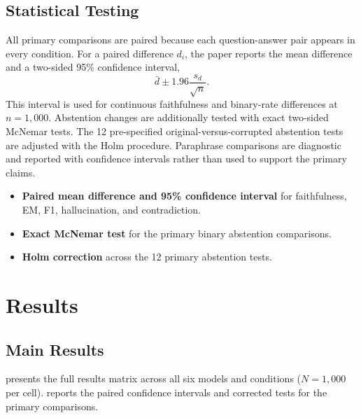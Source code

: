 \documentclass[11pt]{article}
\begin{document}
\subsection{Statistical Testing}

All primary comparisons are paired because each question-answer pair appears in every
condition. For a paired difference $d_i$, the paper reports the mean difference and a
two-sided 95\% confidence interval,
\begin{equation}
  \bar d \pm 1.96\frac{s_d}{\sqrt{n}}.
  \label{eq:paired-ci}
\end{equation}
This interval is used for continuous faithfulness and binary-rate differences at
$n=1{,}000$. Abstention changes are additionally tested with exact two-sided McNemar
tests. The 12 pre-specified original-versus-corrupted abstention tests are adjusted with
the Holm procedure. Paraphrase comparisons are diagnostic and reported with confidence
intervals rather than used to support the primary claims.
\begin{itemize}[noitemsep]
  \item \textbf{Paired mean difference and 95\% confidence interval} for faithfulness,
        EM, F1, hallucination, and contradiction.
  \item \textbf{Exact McNemar test} for the primary binary abstention comparisons.
  \item \textbf{Holm correction} across the 12 primary abstention tests.
\end{itemize}
\FloatBarrier
\section{Results}
\label{sec:results}

\subsection{Main Results}

 presents the full results matrix across all six models and
conditions ($N=1{,}000$ per cell).  reports the paired
confidence intervals and corrected tests for the primary comparisons.
\end{document}
